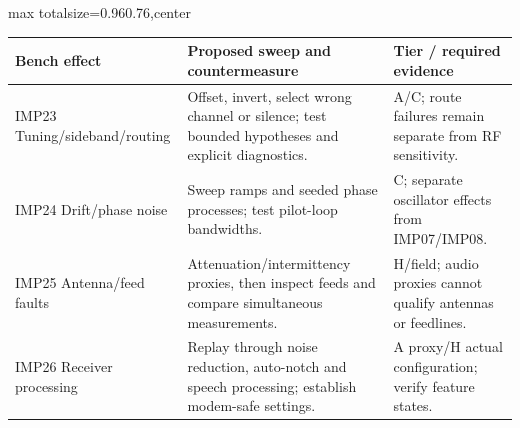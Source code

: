 \documentclass[11pt,a4paper]{article}
\newlength{\tableavail}
\renewcommand{\arraystretch}{1.13}
\begin{document}
\begin{landscape}\thispagestyle{plain}\centering
\setlength{\tabcolsep}{5pt}\renewcommand{\arraystretch}{1.25}
\setlength{\tableavail}{\dimexpr\linewidth-4\tabcolsep\relax}
\begin{adjustbox}{max totalsize={0.96\linewidth}{0.76\textheight},center}
\begin{tabular}{@{}>{\raggedright\arraybackslash}p{0.23\tableavail}>{\raggedright\arraybackslash}p{0.54\tableavail}>{\raggedright\arraybackslash}p{0.23\tableavail}@{}}
\toprule
\textbf{Bench effect} & \textbf{Proposed sweep and countermeasure} & \textbf{Tier / required evidence}\\
\midrule
IMP23 Tuning/sideband/routing & Offset, invert, select wrong channel or silence; test bounded hypotheses and explicit diagnostics. & A/C; route failures remain separate from RF sensitivity.\\[5pt]
IMP24 Drift/phase noise & Sweep ramps and seeded phase processes; test pilot-loop bandwidths. & C; separate oscillator effects from IMP07/IMP08.\\[5pt]
IMP25 Antenna/feed faults & Attenuation/intermittency proxies, then inspect feeds and compare simultaneous measurements. & H/field; audio proxies cannot qualify antennas or feedlines.\\[5pt]
IMP26 Receiver processing & Replay through noise reduction, auto-notch and speech processing; establish modem-safe settings. & A proxy/H actual configuration; verify feature states.\\[5pt]
\bottomrule
\end{tabular}
\end{adjustbox}
\end{landscape}
\end{document}
